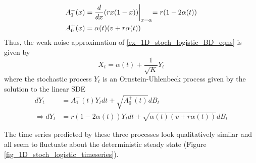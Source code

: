 \begin{align*}
A^-_1(x) &= \frac{d}{dx}(rx(1-x))\biggl{|}_{x=\alpha} = r(1 - 2\alpha(t))\\
A^+_0(x) &= \alpha(t)(v+r\alpha(t))
\end{align*}
Thus, the weak noise approximation of \ref{ex_1D_stoch_logistic_BD_eqns} is given by
\begin{equation}
    X_t = \alpha(t) + \frac{1}{\sqrt{K}}Y_t
\end{equation}
where the stochastic process $Y_t$ is an Ornstein-Uhlenbeck process given by the solution to the linear SDE
\begin{align}
    dY_t &= A^-_1(t)Y_tdt + \sqrt{A^+_0(t)}dB_t\nonumber\\
    \Rightarrow dY_t &= r(1 - 2\alpha(t))Y_tdt + \sqrt{\alpha(t)(v+r\alpha(t))}dB_t\label{ex_1D_stoch_logistic_WNA}
\end{align}

The time series predicted by these three processes look qualitatively similar and all seem to fluctuate about the deterministic steady state (Figure \ref{fig_1D_stoch_logistic_timeseries}).


